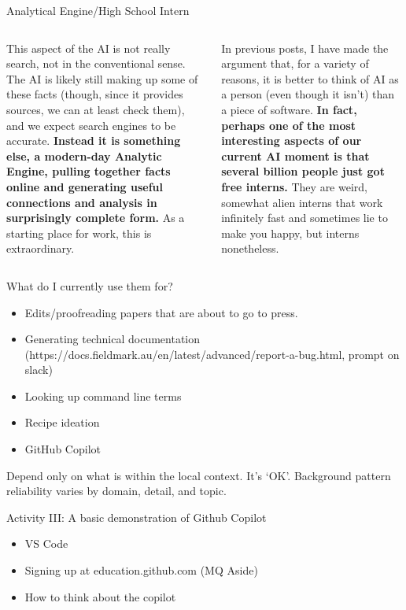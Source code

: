 \documentclass[aspectratio=169]{beamer}
\begin{document}
\begin{frame}{Analytical Engine/High School Intern}
\begin{columns}[t]
    \begin{column}{.5\textwidth}
        This aspect of the AI is not really search, not in the conventional sense. The AI is likely still making up some of these facts (though, since it provides sources, we can at least check them), and we expect search engines to be accurate. \textbf{Instead it is something else, a modern-day Analytic Engine, pulling together facts online and generating useful connections and analysis in surprisingly complete form.} As a starting place for work, this is extraordinary. \parencite{Mollick2023-sj}
    \end{column}
    \begin{column}{.5\textwidth}
        In previous posts, I have made the argument that, for a variety of reasons, it is better to think of AI as a person (even though it isn’t) than a piece of software. \textbf{In fact, perhaps one of the most interesting aspects of our current AI moment is that several billion people just got free interns.} They are weird, somewhat alien interns that work infinitely fast and sometimes lie to make you happy, but interns nonetheless. \parencite{Mollick2023-il}
    \end{column}
\end{columns}
    
		
\end{frame}


\begin{frame}{What do I currently use them for?}
    \begin{itemize}
        \item Edits/proofreading papers that are about to go to press.
	\item Generating technical documentation (https://docs.fieldmark.au/en/latest/advanced/report-a-bug.html, prompt on slack)
	\item Looking up command line terms
        \item Recipe ideation
        \item GitHub Copilot
    \end{itemize}
\vspace{1em}
{\Large Depend only on what is within the local context. It's `OK'. Background pattern reliability varies by domain, detail, and topic.}
		
\end{frame}
\begin{frame}{Activity III: A basic demonstration of Github Copilot}

\begin{itemize}
    \item VS Code
    \item Signing up at education.github.com (MQ Aside)
    \item How to think about the copilot
\end{itemize}
    
\end{frame}
\end{document}
